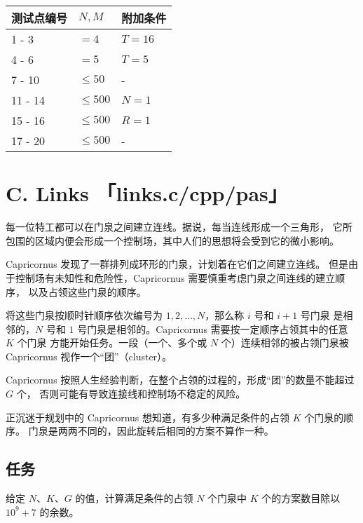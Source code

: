 \documentclass[UTF8, 11pt, a4paper]{article}
\begin{document}
\begin{table}[h]\centering
\begin{tabularx}{0.85 \textwidth}{X|X|X} \hline
测试点编号 & $N, M$     & 附加条件 \\ \hline\hline
1 - 3      & $= 4$      & $T = 16$ \\ \hline
4 - 6      & $= 5$      & $T = 5$ \\ \hline
7 - 10     & $\leq 50$  & - \\ \hline
11 - 14    & $\leq 500$ & $N = 1$ \\ \hline
15 - 16    & $\leq 500$ & $R = 1$ \\ \hline
17 - 20    & $\leq 500$ & - \\ \hline
\end{tabularx}
\end{table}
\newpage


\section*{C. \makebox[1em]{} Links \makebox[2.5em]{} \small{「links.c/cpp/pas」}}
每一位特工都可以在门泉之间建立连线。据说，每当连线形成一个三角形，%
它所包围的区域内便会形成一个控制场，其中人们的思想将会受到它的微小影响。

Capricornus 发现了一群排列成环形的门泉，计划着在它们之间建立连线。%
但是由于控制场有未知性和危险性，Capricornus 需要慎重考虑门泉之间连线的建立顺序，%
以及占领这些门泉的顺序。

将这些门泉按顺时针顺序依次编号为 $1, 2, \dots, N$，那么称 $i$ 号和 $i + 1$ 号门泉%
是相邻的，$N$ 号和 $1$ 号门泉是相邻的。Capricornus 需要按一定顺序占领其中的任意 $K$ 个门泉%
方能开始任务。一段（一个、多个或 $N$ 个）连续相邻的被占领门泉被 Capricornus 视作一个“团”（cluster）。

Capricornus 按照人生经验判断，在整个占领的过程的，形成“团”的数量不能超过 $G$ 个，%
否则可能有导致连接线和控制场不稳定的风险。

正沉迷于规划中的 Capricornus 想知道，有多少种满足条件的占领 $K$ 个门泉的顺序。%
门泉是两两不同的，因此旋转后相同的方案不算作一种。

\subsection*{任务}
给定 $N$、$K$、$G$ 的值，计算满足条件的占领 $N$ 个门泉中 $K$ 个的方案数目除以 $10^9 + 7$ 的余数。
\end{document}
